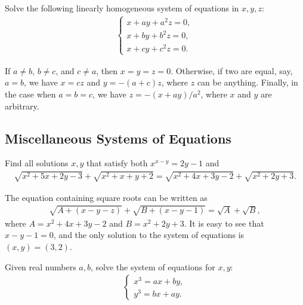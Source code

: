 \documentclass[12pt,a4paper]{memoir}
\theoremstyle{definition}
\begin{document}
\begin{question}
	Solve the following linearly homogeneous system of equations in $x,y,z$:
	\begin{align*}
		\begin{cases}
			x+ay+a^2z=0,\\x+by+b^2z=0,\\x+cy+c^2z=0.
		\end{cases}
	\end{align*}
\end{question}

\begin{solution}
	If $a\neq b$, $b\neq c$, and $c\neq a$, then $x=y=z=0$. Otherwise, if two are equal, say, $a=b$, we have $x=cz$ and $y=-(a+c)z$, where $z$ can be anything. Finally, in the case when $a=b=c$, we have $z=-(x+ay)/a^2$, where $x$ and $y$ are arbitrary.
\end{solution}


\subsection{Miscellaneous Systems of Equations}

\begin{question}
	Find all solutions $x,y$ that satisfy both $x^{x-y}=2y-1$ and
	\begin{align*}
		\sqrt{x^2+5x+2y-3}+\sqrt{x^2+x+y+2} = \sqrt{x^2+4x+3y-2}+\sqrt{x^2+2y+3}.
	\end{align*}
\end{question}

\begin{solution}
	The equation containing square roots can be written as
	\begin{align*}
		\sqrt{A+(x-y-z)} + \sqrt{B + (x-y-1)} = \sqrt{A} + \sqrt{B},
	\end{align*}
	where $A=x^2+4x+3y-2$ and $B=x^2+2y+3$. It is easy to see that $x-y-1=0$, and the only solution to the system of equations is $(x,y)=(3,2)$.
\end{solution}

\begin{question}
	Given real numbers $a,b$, solve the system of equations for $x,y$:
	\begin{align*}
		\begin{cases}
			x^3=ax+by,\\ y^3 = bx+ay.
		\end{cases}
	\end{align*}
\end{question}
\end{document}
